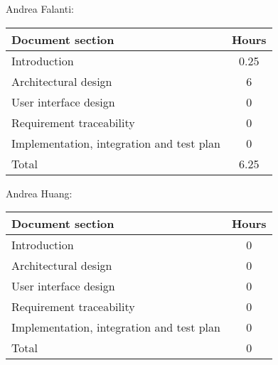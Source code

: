 Andrea Falanti:

\begin{tabular}{|l|c|}
    \hline
    Document section & Hours \\
    \hline
     Introduction & 0.25\\
     Architectural design & 6\\
     User interface design & 0\\
     Requirement traceability & 0\\
     Implementation, integration and test plan & 0\\
     \hline
     Total & 6.25\\
     \hline
\end{tabular}
\vskip 0.3in

Andrea Huang:

\begin{tabular}{|l|c|}
    \hline
    Document section & Hours \\
    \hline
     Introduction & 0\\
     Architectural design & 0\\
     User interface design & 0\\
     Requirement traceability & 0\\
     Implementation, integration and test plan & 0\\
     \hline
     Total & 0\\
     \hline
\end{tabular}